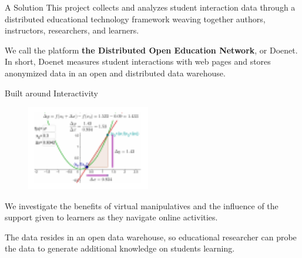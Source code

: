 \begin{sectionblock}{A Solution}
  This project collects and analyzes student interaction data through
  a distributed educational technology framework weaving together
  authors, instructors, researchers, and learners.

  \vspace{1ex}We call the platform \textbf{the Distributed Open
    Education Network}, or Doenet.  In short, Doenet measures student
  interactions with web pages and stores anonymized data in an open
  and distributed data warehouse.
\end{sectionblock}

\vspace{1ex}

\begin{sectionblock}{Built around Interactivity}

  \begin{figure}
    \includegraphics[width=0.48\textwidth]{math-insight.pdf}
  \end{figure}
  We investigate the benefits of virtual manipulatives and the
  influence of the support given to learners as they navigate online
  activities.

  \vspace{1ex}The data resides in an open data warehouse, so 
  educational researcher can probe the data to generate additional
  knowledge on students learning.
\end{sectionblock}

    
